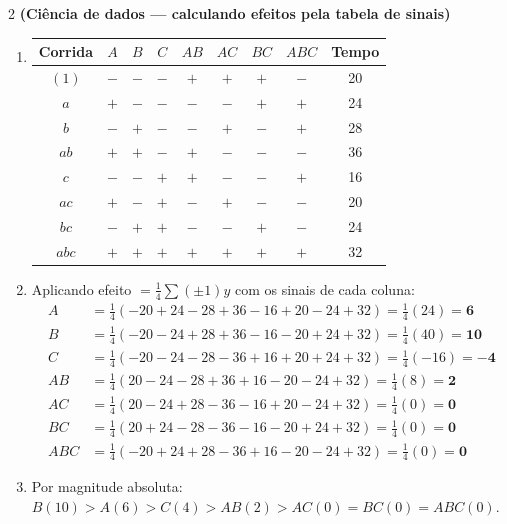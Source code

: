 \documentclass[11pt]{article}
\begin{document}
\begin{questao}{2} \textbf{(Ciência de dados --- calculando efeitos pela tabela de sinais)}
\end{questao}
\begin{solucao}
\begin{enumerate}[label=(\alph*)]
  \item
  \begin{center}
  \begin{tabular}{c|cccccccc}
  Corrida & $A$ & $B$ & $C$ & $AB$ & $AC$ & $BC$ & $ABC$ & Tempo \\ \hline
  $(1)$ & $-$ & $-$ & $-$ & $+$ & $+$ & $+$ & $-$ & 20 \\
  $a$   & $+$ & $-$ & $-$ & $-$ & $-$ & $+$ & $+$ & 24 \\
  $b$   & $-$ & $+$ & $-$ & $-$ & $+$ & $-$ & $+$ & 28 \\
  $ab$  & $+$ & $+$ & $-$ & $+$ & $-$ & $-$ & $-$ & 36 \\
  $c$   & $-$ & $-$ & $+$ & $+$ & $-$ & $-$ & $+$ & 16 \\
  $ac$  & $+$ & $-$ & $+$ & $-$ & $+$ & $-$ & $-$ & 20 \\
  $bc$  & $-$ & $+$ & $+$ & $-$ & $-$ & $+$ & $-$ & 24 \\
  $abc$ & $+$ & $+$ & $+$ & $+$ & $+$ & $+$ & $+$ & 32 \\
  \end{tabular}
  \end{center}
  \item Aplicando efeito $=\frac14\sum(\pm1)y$ com os sinais de cada coluna:
  \begin{align*}
  A &= \tfrac14(-20+24-28+36-16+20-24+32) = \tfrac14(24) = \mathbf{6} \\
  B &= \tfrac14(-20-24+28+36-16-20+24+32) = \tfrac14(40) = \mathbf{10} \\
  C &= \tfrac14(-20-24-28-36+16+20+24+32) = \tfrac14(-16) = \mathbf{-4} \\
  AB &= \tfrac14(20-24-28+36+16-20-24+32) = \tfrac14(8) = \mathbf{2} \\
  AC &= \tfrac14(20-24+28-36-16+20-24+32) = \tfrac14(0) = \mathbf{0} \\
  BC &= \tfrac14(20+24-28-36-16-20+24+32) = \tfrac14(0) = \mathbf{0} \\
  ABC &= \tfrac14(-20+24+28-36+16-20-24+32) = \tfrac14(0) = \mathbf{0}
  \end{align*}
  \item Por magnitude absoluta: $B(10) > A(6) > C(4) > AB(2) > AC(0)=BC(0)=ABC(0)$.
\end{enumerate}
\end{solucao}
\end{document}
